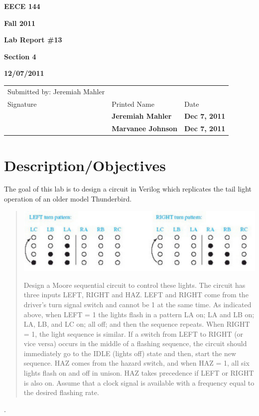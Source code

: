 \documentclass[12pt]{article}
\begin{document}
\centerline{\bf EECE 144}
\centerline{\bf Fall 2011}
\centerline{\bf}
\centerline{\bf Lab Report \#13}
\centerline{\bf Section 4}
\centerline{\bf 12/07/2011} %
\begin{center}
\begin{tabularx}{\textwidth}[b]{X l l}
Submitted by: Jeremiah Mahler & & \\
Signature & Printed Name & Date \\
\hline
\multicolumn{1}{|X|}{} & \multicolumn{1}{|l|}{\bigstrut \bf Jeremiah Mahler} & \multicolumn{1}{|l|}{\bf Dec 7, 2011} \\
\hline
\multicolumn{1}{|X|}{} & \multicolumn{1}{|l|}{\bigstrut \bf Marvanee Johnson} & \multicolumn{1}{|l|}{\bf Dec 7, 2011} \\
\hline
\end{tabularx}
\end{center}

\section{Description/Objectives}

The goal of this lab is to design a circuit in Verilog\cite{VERILOG}
which replicates the tail light operation of an older model Thunderbird.

\begin{quote}
\begin{center}
\includegraphics[scale=0.7]{thunderbird-lights}
\end{center}

Design a Moore sequential circuit to control these lights.
The circuit has three inputs LEFT, RIGHT and HAZ.  LEFT and
RIGHT come from the driver's turn signal switch and cannot be 1 at the same
time.
As indicated above, when LEFT = 1 the lights flash in a pattern LA on;
LA and LB on; LA, LB, and LC on; all off; and then the sequence repeats.
When RIGHT = 1, the light sequence is similar.
If a switch from LEFT to RIGHT (or vice versa) occurs in the middle of a flashing
sequence, the circuit should immediately go to the IDLE (lights off) state
and then, start the new sequence.  HAZ comes from the hazard switch,
and when HAZ = 1, all six lights flash on and off in unison.
HAZ takes precedence if LEFT or RIGHT is also on.
Assume that a clock signal is available with a frequency equal to the desired
flashing rate.
\end{quote}
\cite[p. 547, prob. 16.27]{roth2009fundamentals}.
\end{document}
